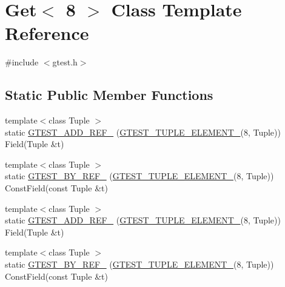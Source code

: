 \hypertarget{classstd_1_1tr1_1_1gtest__internal_1_1Get_3_018_01_4}{\section{\-Get$<$ 8 $>$ \-Class \-Template \-Reference}
\label{d7/dbc/classstd_1_1tr1_1_1gtest__internal_1_1Get_3_018_01_4}
}


{\ttfamily \#include $<$gtest.\-h$>$}

\subsection*{\-Static \-Public \-Member \-Functions}
\begin{DoxyCompactItemize}
\item 
{\footnotesize template$<$class Tuple $>$ }\\static \hyperlink{classstd_1_1tr1_1_1gtest__internal_1_1Get_3_018_01_4_abfc99af60916f9ff861cda6eb94e0bae}{\-G\-T\-E\-S\-T\-\_\-\-A\-D\-D\-\_\-\-R\-E\-F\-\_\-} (\hyperlink{gtest-tuple_8h_a1b7f133d8aa02e0b7afed7b66781eeb7}{\-G\-T\-E\-S\-T\-\_\-\-T\-U\-P\-L\-E\-\_\-\-E\-L\-E\-M\-E\-N\-T\-\_\-}(8, \-Tuple)) \-Field(\-Tuple \&t)
\item 
{\footnotesize template$<$class Tuple $>$ }\\static \hyperlink{classstd_1_1tr1_1_1gtest__internal_1_1Get_3_018_01_4_a55e3d866914ee345171d03452c5b2789}{\-G\-T\-E\-S\-T\-\_\-\-B\-Y\-\_\-\-R\-E\-F\-\_\-} (\hyperlink{gtest-tuple_8h_a1b7f133d8aa02e0b7afed7b66781eeb7}{\-G\-T\-E\-S\-T\-\_\-\-T\-U\-P\-L\-E\-\_\-\-E\-L\-E\-M\-E\-N\-T\-\_\-}(8, \-Tuple)) \-Const\-Field(const \-Tuple \&t)
\item 
{\footnotesize template$<$class Tuple $>$ }\\static \hyperlink{classstd_1_1tr1_1_1gtest__internal_1_1Get_3_018_01_4_abfc99af60916f9ff861cda6eb94e0bae}{\-G\-T\-E\-S\-T\-\_\-\-A\-D\-D\-\_\-\-R\-E\-F\-\_\-} (\hyperlink{gtest-tuple_8h_a1b7f133d8aa02e0b7afed7b66781eeb7}{\-G\-T\-E\-S\-T\-\_\-\-T\-U\-P\-L\-E\-\_\-\-E\-L\-E\-M\-E\-N\-T\-\_\-}(8, \-Tuple)) \-Field(\-Tuple \&t)
\item 
{\footnotesize template$<$class Tuple $>$ }\\static \hyperlink{classstd_1_1tr1_1_1gtest__internal_1_1Get_3_018_01_4_a55e3d866914ee345171d03452c5b2789}{\-G\-T\-E\-S\-T\-\_\-\-B\-Y\-\_\-\-R\-E\-F\-\_\-} (\hyperlink{gtest-tuple_8h_a1b7f133d8aa02e0b7afed7b66781eeb7}{\-G\-T\-E\-S\-T\-\_\-\-T\-U\-P\-L\-E\-\_\-\-E\-L\-E\-M\-E\-N\-T\-\_\-}(8, \-Tuple)) \-Const\-Field(const \-Tuple \&t)
\end{DoxyCompactItemize}


